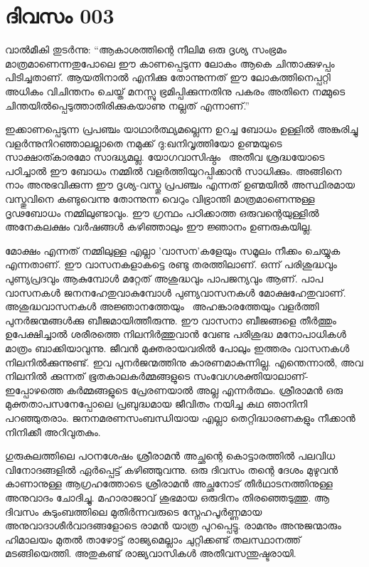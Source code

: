  
\section{ദിവസം 003}

വാല്‍മീകി തുടര്‍ന്നു: ``ആകാശത്തിന്റെ നീലിമ ഒരു ദൃശ്യ സംഭ്രമം
മാത്രമാണെന്നതുപോലെ ഈ കാണപ്പെടുന്ന ലോകം ആകെ ചിന്താക്കുഴപ്പം പിടിച്ചതാണ്‌.
ആയതിനാല്‍ എനിക്കു തോന്നുന്നത്‌ ഈ ലോകത്തിനെപ്പറ്റി അധികം വിചിന്തനം
ചെയ്ത്‌ മനസ്സു ഭ്രമിപ്പിക്കുന്നതിനു പകരം അതിനെ നമ്മുടെ
ചിന്തയില്‍പ്പെടുത്താതിരിക്കുകയാണു നല്ലത്‌ എന്നാണ്‌.''~

ഇക്കാണപ്പെടുന്ന പ്രപഞ്ചം യാഥാര്‍ത്ഥ്യമല്ലെന്ന ഉറച്ച ബോധം ഉള്ളില്‍
അങ്കുരിച്ചു വളര്‍ന്നുനിറഞ്ഞാലല്ലാതെ നമുക്ക്‌ ദു:ഖനിവൃത്തിയോ ഉണ്മയുടെ
സാക്ഷാത്കാരമോ സാദ്ധ്യമല്ല. യോഗവാസിഷ്ഠം ~അതീവ ശ്രദ്ധയോടെ പഠിച്ചാല്‍ ഈ
ബോധം നമ്മില്‍ വളര്‍ത്തിയുറപ്പിക്കാന്‍ സാധിക്കും. അങ്ങിനെ നാം
അനുഭവിക്കുന്ന ഈ ദൃശ്യ-വസ്തു പ്രപഞ്ചം എന്നത്‌ ഉണ്മയില്‍ അസ്ഥിരമായ
വസ്തുവിനെ കണ്ടുവെന്നു തോന്നുന്ന വെറും വിഭ്രാന്തി മാത്രമാണെന്നുള്ള
ദൃഢബോധം നമ്മിലുണ്ടാവും. ഈ ഗ്രന്ഥം പഠിക്കാത്ത ഒരുവന്റെയുള്ളില്‍ അനേകലക്ഷം
വര്‍ഷങ്ങള്‍ കഴിഞ്ഞാലും ഈ ജ്ഞാനം ഉണരുകയില്ല.

മോക്ഷം എന്നത്‌ നമ്മിലുള്ള എല്ലാ 'വാസന'കളേയും സമൂലം നീക്കം ചെയ്യുക
എന്നതാണ്‌. ഈ വാസനകളാകട്ടെ രണ്ടു തരത്തിലാണ്‌. ഒന്ന് പരിശുദ്ധവും
പുണ്യപ്രദവും ആകുമ്പോള്‍ മറ്റേത്‌ അശുദ്ധവും പാപജന്യവും ആണ്‌. പാപ വാസനകള്‍
ജനനഹേതുവാകുമ്പോള്‍ പുണ്യവാസനകള്‍ മോക്ഷഹേതുവാണ്‌. അശുദ്ധവാസനകള്‍
അജ്ഞാനത്തേയും ~അഹങ്കാരത്തേയും വളര്‍ത്തി പുനര്‍ജന്മങ്ങള്‍ക്കു
ബീജമായിത്തീരുന്നു. ഈ വാസനാ ബീജങ്ങളെ തീര്‍ത്തും ഉപേക്ഷിച്ചാല്‍ ശരീരത്തെ
നിലനിര്‍ത്തുവാന്‍ വേണ്ട പരിശുദ്ധ മനോപാധികള്‍ മാത്രം ബാക്കിയാവുന്നു.
ജീവന്‍ മുക്തരായവരില്‍ പോലും ഇത്തരം വാസനകള്‍ നിലനില്‍ക്കുന്നുണ്ട്‌. ഇവ
പുനര്‍ജന്മത്തിനു കാരണമാകുന്നില്ല. എന്തെന്നാല്‍, അവ നിലനില്‍ ക്കുന്നത്‌
ഭൂതകാലകര്‍മ്മങ്ങളുടെ സംവേഗശക്തിയാലാണ്‌- ഇപ്പോഴത്തെ കര്‍മ്മങ്ങളുടെ
പ്രേരണയാല്‍ അല്ല എന്നര്‍ത്ഥം. ശ്രീരാമന്‍ ഒരു മുക്തതാപസനേപ്പോലെ
പ്രബുദ്ധമായ ജീവിതം നയിച്ച കഥ ഞാനിനി പറഞ്ഞുതരാം. ജനനമരണസംബന്ധിയായ എല്ലാ
തെറ്റിദ്ധാരണകളും നീക്കാന്‍ നിനിക്കീ അറിവുതകും.~

ഗുരുകുലത്തിലെ പഠനശേഷം ശ്രീരാമന്‍ അച്ഛന്റെ കൊട്ടാരത്തില്‍ പലവിധ
വിനോദങ്ങളില്‍ ഏര്‍പ്പെട്ട്‌ കഴിഞ്ഞുവന്നു. ഒരു ദിവസം തന്റെ ദേശം മുഴുവന്‍
കാണാനുള്ള ആഗ്രഹത്തോടെ ശ്രീരാമന്‍ അച്ഛനോട്‌ തീര്‍ഥാടനത്തിനുള്ള അനുവാദം
ചോദിച്ചു. മഹാരാജാവ്‌ ശുഭമായ ഒരുദിനം തിരഞ്ഞെടുത്തു. ആ ദിവസം കുടുംബത്തിലെ
മുതിര്‍ന്നവരുടെ സ്നേഹപൂര്‍ണ്ണമായ അനുവാദാശീര്‍വാദങ്ങളോടെ രാമന്‍ യാത്ര
പുറപ്പെട്ടു. രാമനും അനുജന്മാരും ഹിമാലയം മുതല്‍ താഴോട്ട്‌ രാജ്യമെല്ലാം
ചുറ്റിക്കണ്ട്‌ തലസ്ഥാനത്ത്‌ മടങ്ങിയെത്തി. അതുകണ്ട്‌ രാജ്യവാസികള്‍
അതീവസന്തുഷ്ടരായി.

